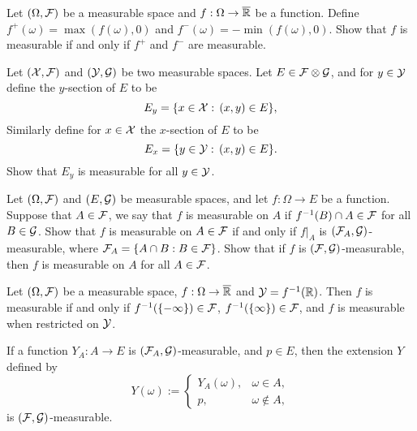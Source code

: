 \begin{problem}
    Let $(\Omega,\mathcal F)$ be a measurable space and $f:\Omega\to\overline{\mathbb R}$ be a function. 
    Define $f^+(\omega) = \max(f(\omega),0)$ and  $f^-(\omega) = -\min(f(\omega),0)$.
    Show that $f$ is measurable if and only if $f^+$ and $f^{-}$ are measurable.
\end{problem}

\begin{problem}   Let $(\mathcal X,\mathcal F)$ and $(\mathcal Y,\mathcal G)$ be two measurable spaces. Let $E\in \mathcal F\otimes \mathcal G$, and for $y\in \mathcal Y$ define the $y$-section of $E$ to be 
    \begin{equation*}
        E_y = \{x\in \mathcal X:\, (x,y)\in E\}, 
    \end{equation*}
    Similarly define for $x\in \mathcal X$ the $x$-section of $E$ to be 
    \begin{equation*}
        E_x = \{y\in \mathcal Y:\, (x,y)\in E\}.
    \end{equation*}
    Show that $E_y$ is measurable for all $y\in \mathcal Y$.
\end{problem}

\begin{problem} Let $(\Omega,\mathcal F)$ and $(E,\mathcal G)$ be measurable spaces, and let $f :\Omega \to E$
 be a function. Suppose that $A\in \mathcal F$, we say that $f$ is measurable on $A$ if 
 $f^{-1}(B)\cap A\in \mathcal F$ for all $B\in  \mathcal G$. Show that $f$ is measurable on $A\in \mathcal F$ if and only if $f|_A$ is $(\mathcal F_A,\mathcal G)$-measurable, where $\mathcal F_A = \{A\cap B: B\in \mathcal F\}$. 
 Show that if $f$ is $(\mathcal F,\mathcal G)$-measurable, then $f$ is measurable on $A$ for all $A\in \mathcal F$.
\end{problem}

\begin{problem} Let $(\Omega,\mathcal F)$ be a measurable space, $f :\Omega \to \overline{\mathbb R}$ and $\mathcal Y=f^{-1}(\mathbb R)$. Then $f$ is measurable if and only if $f^{-1} ( \{ -\infty\}) \in \mathcal F$, $f^{-1} ( \{ \infty\}) \in  \mathcal F$, and $f$ is measurable when restricted on $\mathcal Y$. 
\end{problem}

\begin{problem}
    If a function $Y_A : A \to E$ is $(\mathcal F_A, \mathcal G)$-measurable, and $p \in E$, then
the extension $Y$ defined by
\begin{equation*}
    Y (\omega) := \begin{cases}
Y_A(\omega),  &\omega \in A,\\
p, &\omega\notin A,
    \end{cases}
\end{equation*}
is $(\mathcal F, \mathcal G)$-measurable.
\end{problem}

